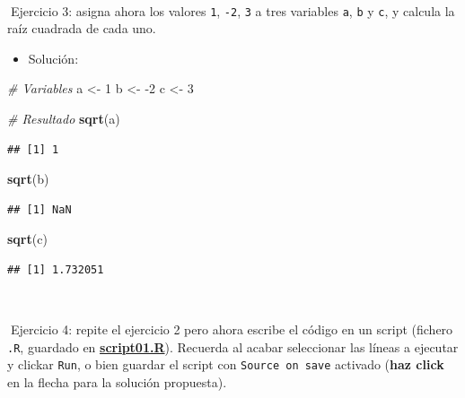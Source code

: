 \documentclass[11pt,]{book}
\newenvironment{Shaded}{\begin{snugshade}}{\end{snugshade}}
\newcommand{\CommentTok}[1]{\textcolor[rgb]{0.37,0.37,0.37}{\textit{#1}}}
\newcommand{\DecValTok}[1]{\textcolor[rgb]{0.06,0.06,0.06}{#1}}
\newcommand{\KeywordTok}[1]{\textcolor[rgb]{0.27,0.27,0.27}{\textbf{#1}}}
\newcommand{\NormalTok}[1]{#1}
\newcommand{\StringTok}[1]{\textcolor[rgb]{0.5,0.5,0.5}{#1}}
\providecommand{\tightlist}{%
  \setlength{\itemsep}{0pt}\setlength{\parskip}{0pt}}
\begin{document}
~

📝Ejercicio 3: asigna ahora los valores \texttt{1}, \texttt{-2}, \texttt{3} a tres variables \texttt{a}, \texttt{b} y \texttt{c}, y calcula la raíz cuadrada de cada uno.

\begin{itemize}
\tightlist
\item
  Solución:
\end{itemize}

\begin{Shaded}
\begin{Highlighting}[]
\CommentTok{# Variables}
\NormalTok{a <-}\StringTok{ }\DecValTok{1}
\NormalTok{b <-}\StringTok{ }\DecValTok{-2}
\NormalTok{c <-}\StringTok{ }\DecValTok{3}

\CommentTok{# Resultado}
\KeywordTok{sqrt}\NormalTok{(a)}
\end{Highlighting}
\end{Shaded}

\begin{verbatim}
## [1] 1
\end{verbatim}

\begin{Shaded}
\begin{Highlighting}[]
\KeywordTok{sqrt}\NormalTok{(b)}
\end{Highlighting}
\end{Shaded}

\begin{verbatim}
## [1] NaN
\end{verbatim}

\begin{Shaded}
\begin{Highlighting}[]
\KeywordTok{sqrt}\NormalTok{(c)}
\end{Highlighting}
\end{Shaded}

\begin{verbatim}
## [1] 1.732051
\end{verbatim}

~

📝Ejercicio 4: repite el ejercicio 2 pero ahora escribe el código en un script (fichero \texttt{.R}, guardado en \href{https://github.com/dadosdelaplace/courses-ECI-2022/blob/main/scripts/script01.R}{\textbf{script01.R}}). Recuerda al acabar seleccionar las líneas a ejecutar y clickar \texttt{Run}, o bien guardar el script con \texttt{Source\ on\ save} activado (\textbf{haz click} en la flecha para la solución propuesta).
\end{document}
